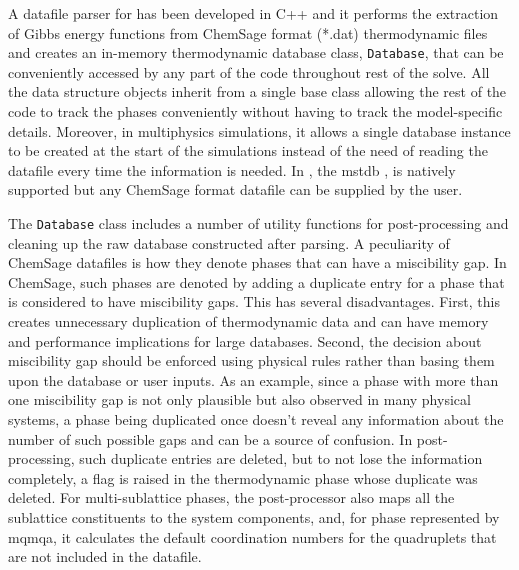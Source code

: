 	A datafile parser for {\GEM} has been developed in C++ and it performs the extraction of Gibbs energy functions from ChemSage format (*.dat) thermodynamic files and creates an in-memory thermodynamic database class, \texttt{Database}, that can be conveniently accessed by any part of the code throughout rest of the solve. All the data structure objects inherit from a single base class allowing the rest of the code to track the phases conveniently without having to track the model-specific  details. Moreover, in multiphysics simulations, it allows a single database instance to be created at the start of the simulations instead of the need of reading the datafile every time the information is needed. In {\GEM}, the \gls{mstdb} \cite{Besmann:2021aa,Ard:2022aa}, is natively supported but any ChemSage format datafile can be supplied by the user.
	
	The \texttt{Database} class includes a number of utility functions for post-processing and cleaning up the raw database constructed after parsing. A peculiarity of ChemSage datafiles is how they denote phases that can have a miscibility gap. In ChemSage, such phases are denoted by adding a duplicate entry for a phase that is considered to have miscibility gaps. This has several disadvantages. First, this creates unnecessary duplication of thermodynamic data and can have memory and performance implications for large databases. Second, the decision about miscibility gap should be enforced using physical rules rather than basing them upon the database or user inputs. As an example, since a phase with more than one miscibility gap is not only plausible but also observed in many physical systems, a phase being duplicated once doesn't reveal any information about the number of such possible gaps and can be a source of confusion. In post-processing, such duplicate entries are deleted, but to not lose the information completely, a flag is raised in the thermodynamic phase whose duplicate was deleted. For multi-sublattice phases, the post-processor also maps all the sublattice constituents to the system components, and, for phase represented by \gls{mqmqa}, it calculates the default coordination numbers for the quadruplets that are not included in the datafile.
	
